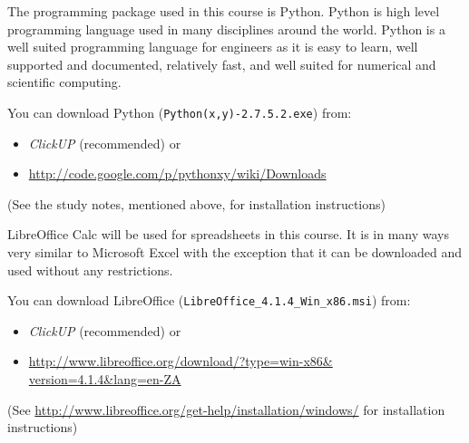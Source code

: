         The programming package used in this course is Python. Python is
        high level programming language used in many disciplines around the
        world. Python is a well suited programming language for engineers as
        it is easy to learn, well supported and documented, relatively fast,
        and well suited for numerical and scientific computing.

        You can download Python ({\tt Python(x,y)-2.7.5.2.exe}) from:
        \begin{itemize}
            \item {\it ClickUP} (recommended) or
            \item \url{http://code.google.com/p/pythonxy/wiki/Downloads}
        \end{itemize}
        (See the study notes, mentioned above, for installation instructions)

        LibreOffice Calc will be used for spreadsheets in this course. It is
        in many ways very similar to Microsoft Excel with the exception
        that it can be downloaded and used without any restrictions.

        You can download LibreOffice
        ({\tt LibreOffice\_4.1.4\_Win\_x86.msi}) from:
        \begin{itemize}
            \item {\it ClickUP} (recommended) or
            \item \url{http://www.libreoffice.org/download/?type=win-x86&
                       version=4.1.4&lang=en-ZA}
        \end{itemize}
        (See \url{http://www.libreoffice.org/get-help/installation/windows/}
        for installation instructions)
